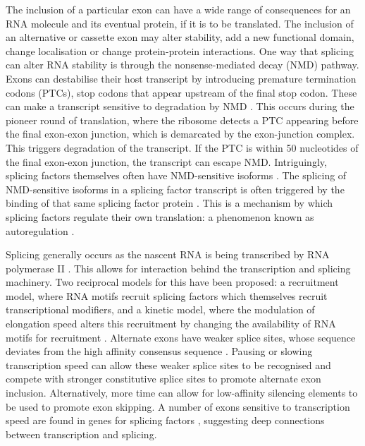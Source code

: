 The inclusion of a particular exon can have a wide range of consequences for an RNA molecule and its eventual protein, if it is to be translated. 
The inclusion of an alternative or cassette exon may alter stability, add a new functional domain, change localisation or change protein-protein interactions.
One way that splicing can alter RNA stability is through the nonsense-mediated decay (NMD) pathway.
Exons can destabilise their host transcript by introducing premature termination codons (PTCs), stop codons that appear upstream of the final stop codon. 
These can make a transcript sensitive to degradation by NMD \citep{McGlincy2008-wh}. 
This occurs during the pioneer round of translation, where the ribosome detects a PTC appearing before the final exon-exon junction, which is demarcated by the exon-junction complex.
This triggers degradation of the transcript.
If the PTC is within 50 nucleotides of the final exon-exon junction, the transcript can escape NMD.
Intriguingly, splicing factors themselves often have NMD-sensitive isoforms \citep{Ni2007}. 
The splicing of NMD-sensitive isoforms in a splicing factor transcript is often triggered by the binding of that same splicing factor protein \citep{Jangi2014a}. 
This is a mechanism by which splicing factors regulate their own translation: a phenomenon known as autoregulation \citep{Rosenfeld2002}.

Splicing generally occurs as the nascent RNA is being transcribed by RNA polymerase II \citep{Beyer1988,Ameur2011}.
This allows for interaction behind the transcription and splicing machinery.
Two reciprocal models for this have been proposed: a recruitment model, where RNA motifs recruit splicing factors which themselves recruit transcriptional modifiers, and a kinetic model, where the modulation of elongation speed alters this recruitment by changing the availability of RNA motifs for recruitment \citep{Kornblihtt2004a}.
Alternate exons have weaker splice sites, whose sequence deviates from the high affinity consensus sequence \citep{Stamm2000}.
Pausing or slowing transcription speed can allow these weaker splice sites to be recognised and compete with stronger constitutive splice sites to promote alternate exon inclusion.
Alternatively, more time can allow for low-affinity silencing elements to be used to promote exon skipping.
A number of exons sensitive to transcription speed are found in genes for splicing factors \citep{Ip2011}, suggesting deep connections between transcription and splicing. 

